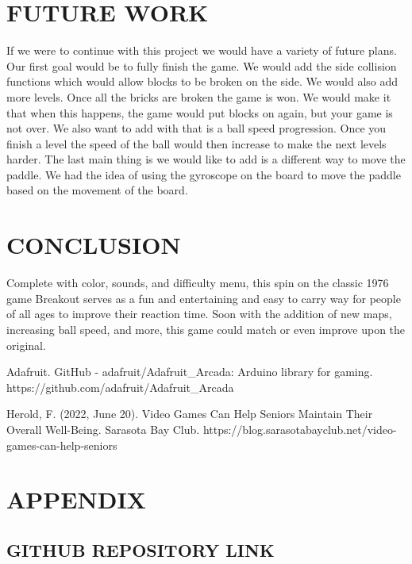 \documentclass[12pt]{article}
\begin{document}
\section{FUTURE WORK}

If we were to continue with this project we would have a variety of future plans. Our first goal would be to fully finish the game. We would add the side collision functions which would allow blocks to be broken on the side. We would also add more levels. Once all the bricks are broken the game is won. We would make it that when this happens, the game would put blocks on again, but your game is not over. We also want to add with that is a ball speed progression. Once you finish a level the speed of the ball would then increase to make the next levels harder. The last main thing is we would like to add is a different way to move the paddle. We had the idea of using the gyroscope on the board to move the paddle based on the movement of the board.

\section{CONCLUSION}

Complete with color, sounds, and difficulty menu, this spin on the classic 1976 game Breakout serves as a fun and entertaining and easy to carry way for people of all ages to improve their reaction time. Soon with the addition of new maps, increasing ball speed, and more, this game could match or even improve upon the original.

\newpage


\begin{thebibliography}{unsrt}

Adafruit. GitHub - adafruit/Adafruit\_Arcada: Arduino library for gaming. https://github.com/adafruit/Adafruit\_Arcada

Herold, F. (2022, June 20). Video Games Can Help Seniors Maintain Their Overall Well-Being. Sarasota Bay Club. https://blog.sarasotabayclub.net/video-games-can-help-seniors
\end{thebibliography}

\newpage
\section{APPENDIX}

\subsection{GITHUB REPOSITORY LINK}
\end{document}
